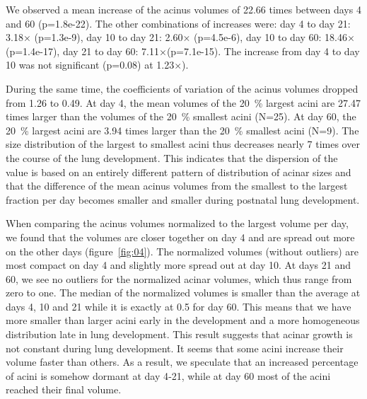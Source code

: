 \documentclass[
  american,
]{article}
\begin{document}
We observed a mean increase of the acinus volumes of 22.66 times between days 4 and 60 (p=1.8e-22).
The other combinations of increases were: day 4 to day 21: 3.18× (p=1.3e-9), day 10 to day 21: 2.60× (p=4.5e-6), day 10 to day 60: 18.46× (p=1.4e-17), day 21 to day 60: 7.11×(p=7.1e-15).
The increase from day 4 to day 10 was not significant (p=0.08) at 1.23×).

During the same time, the coefficients of variation of the acinus volumes dropped from 1.26 to 0.49.
At day 4, the mean volumes of the 20~\% largest acini are 27.47 times larger than the volumes of the 20~\% smallest acini (N=25).
At day 60, the 20~\% largest acini are 3.94 times larger than the 20~\% smallest acini (N=9).
The size distribution of the largest to smallest acini thus decreases nearly 7 times over the course of the lung development.
This indicates that the dispersion of the value is based on an entirely different pattern of distribution of acinar sizes and that the difference of the mean acinus volumes from the smallest to the largest fraction per day becomes smaller and smaller during postnatal lung development.

When comparing the acinus volumes normalized to the largest volume per day, we found that the volumes are closer together on day 4 and are spread out more on the other days (figure~\ref{fig:04}).
The normalized volumes (without outliers) are most compact on day 4 and slightly more spread out at day 10.
At days 21 and 60, we see no outliers for the normalized acinar volumes, which thus range from zero to one.
The median of the normalized volumes is smaller than the average at days 4, 10 and 21 while it is exactly at 0.5 for day 60.
This means that we have more smaller than larger acini early in the development and a more homogeneous distribution late in lung development.
This result suggests that acinar growth is not constant during lung development.
It seems that some acini increase their volume faster than others.
As a result, we speculate that an increased percentage of acini is somehow dormant at day 4‐21, while at day 60 most of the acini reached their final volume.
\end{document}
